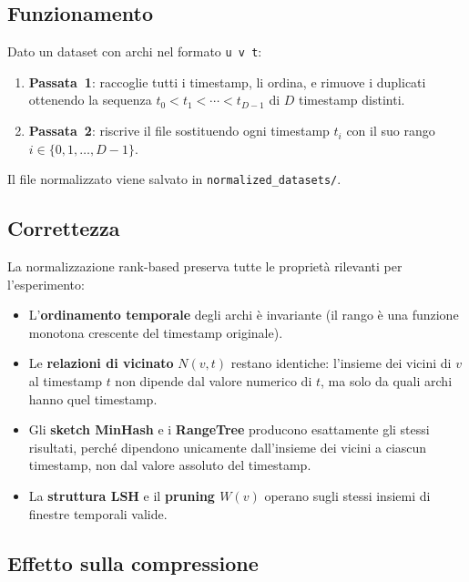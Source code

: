 \documentclass[a4paper,11pt]{article}
\begin{document}
\subsection{Funzionamento}

Dato un dataset con archi nel formato \texttt{u v t}:
\begin{enumerate}
  \item \textbf{Passata~1}: raccoglie tutti i timestamp, li ordina, e rimuove i duplicati ottenendo la sequenza $t_0 < t_1 < \cdots < t_{D-1}$ di $D$ timestamp distinti.
  \item \textbf{Passata~2}: riscrive il file sostituendo ogni timestamp $t_i$ con il suo rango $i \in \{0, 1, \ldots, D-1\}$.
\end{enumerate}

Il file normalizzato viene salvato in \texttt{normalized\_datasets/}.

\subsection{Correttezza}

La normalizzazione rank-based preserva tutte le propriet\`a rilevanti per l'esperimento:
\begin{itemize}
  \item L'\textbf{ordinamento temporale} degli archi \`e invariante (il rango \`e una funzione monotona crescente del timestamp originale).
  \item Le \textbf{relazioni di vicinato} $N(v, t)$ restano identiche: l'insieme dei vicini di $v$ al timestamp $t$ non dipende dal valore numerico di $t$, ma solo da quali archi hanno quel timestamp.
  \item Gli \textbf{sketch MinHash} e i \textbf{RangeTree} producono esattamente gli stessi risultati, perch\'e dipendono unicamente dall'insieme dei vicini a ciascun timestamp, non dal valore assoluto del timestamp.
  \item La \textbf{struttura LSH} e il \textbf{pruning $W(v)$} operano sugli stessi insiemi di finestre temporali valide.
\end{itemize}

\subsection{Effetto sulla compressione}
\end{document}
